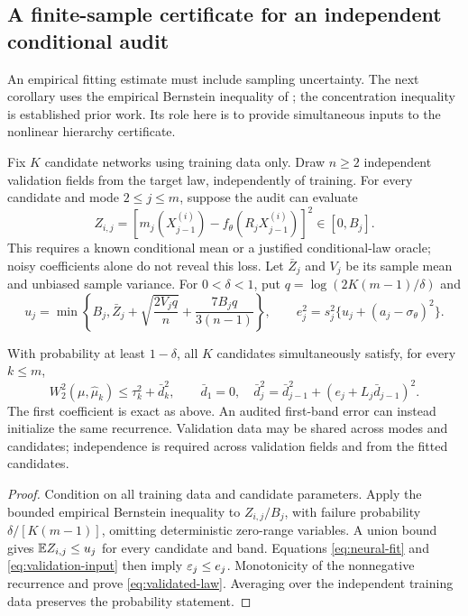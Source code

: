 \subsection{A finite-sample certificate for an independent conditional audit}\label{sec:validation}
An empirical fitting estimate must include sampling uncertainty. The next corollary uses the empirical Bernstein inequality of \citet[Theorem~4]{maurer2009}; the concentration inequality is established prior work. Its role here is to provide simultaneous inputs to the nonlinear hierarchy certificate.

Fix $K$ candidate networks using training data only. Draw $n\ge2$ independent validation fields from the target law, independently of training. For every candidate and mode $2\le j\le m$, suppose the audit can evaluate
\[
 Z_{i,j}=\left[m_j(X^{(i)}_{j-1})-
 f_\theta(R_jX^{(i)}_{j-1})\right]^2\in[0,B_j].
\]
This requires a known conditional mean or a justified conditional-law oracle; noisy coefficients alone do not reveal this loss. Let $\bar Z_j$ and $V_j$ be its sample mean and unbiased sample variance. For $0<\delta<1$, put $q=\log(2K(m-1)/\delta)$ and
\begin{equation}\label{eq:validation-input}
 u_j=\min\left\{B_j,\bar Z_j+
 \sqrt{\frac{2V_jq}{n}}+\frac{7B_jq}{3(n-1)}\right\},\qquad
 e_j^2=s_j^2\{u_j+(a_j-\sigma_\theta)^2\}.
\end{equation}

\begin{corollary}\label{cor:validated-law}
With probability at least $1-\delta$, all $K$ candidates simultaneously satisfy, for every $k\le m$,
\begin{equation}\label{eq:validated-law}
 W_2^2(\mu,\widehat\mu_k)\le\tau_k^2+\bar d_k^2,
 \qquad
 \bar d_1=0,\quad
 \bar d_j^2=\bar d_{j-1}^2+(e_j+L_j\bar d_{j-1})^2.
\end{equation}
The first coefficient is exact as above. An audited first-band error can instead initialize the same recurrence. Validation data may be shared across modes and candidates; independence is required across validation fields and from the fitted candidates.
\end{corollary}
\begin{proof}
Condition on all training data and candidate parameters. Apply the bounded empirical Bernstein inequality to $Z_{i,j}/B_j$, with failure probability $\delta/[K(m-1)]$, omitting deterministic zero-range variables. A union bound gives $\mathbb E Z_{i,j}\le u_j$ for every candidate and band. Equations \eqref{eq:neural-fit} and \eqref{eq:validation-input} then imply $\varepsilon_j\le e_j$. Monotonicity of the nonnegative recurrence and  prove \eqref{eq:validated-law}. Averaging over the independent training data preserves the probability statement.
\end{proof}

